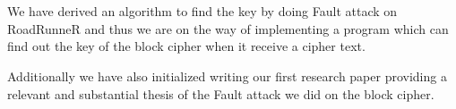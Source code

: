 \section*{\fontsize{25}{29}\selectfont{\textbf Future Work} \\}

We have derived an algorithm to find the key by doing Fault attack on RoadRunneR and thus we are on the way of implementing a program which can find out the key of the block cipher when it receive a cipher text.

Additionally we have also initialized writing our first research paper providing a relevant and substantial thesis of the Fault attack we did on the block cipher.